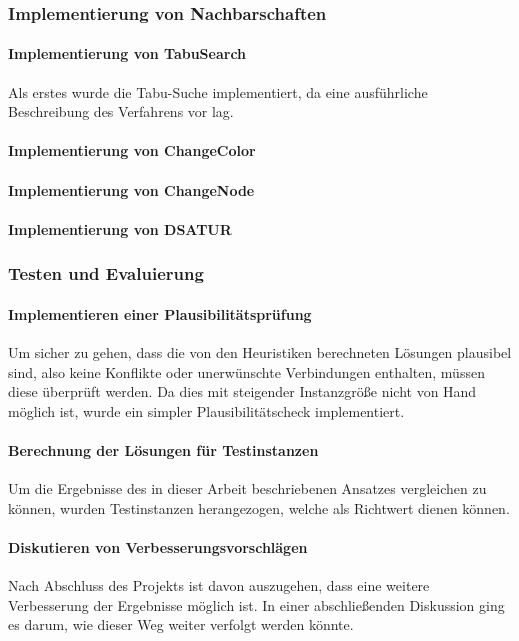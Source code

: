 \subsubsection{Implementierung von Nachbarschaften}

\paragraph{Implementierung von TabuSearch}{Als erstes wurde die Tabu-Suche implementiert, da eine ausführliche Beschreibung des Verfahrens vor lag.} %
\paragraph{Implementierung von ChangeColor}{} %
\paragraph{Implementierung von ChangeNode}{} %
\paragraph{Implementierung von DSATUR}{}

\subsubsection{Testen und Evaluierung}

\paragraph{Implementieren einer Plausibilitätsprüfung}{Um sicher zu gehen, dass die von den Heuristiken berechneten Lösungen plausibel sind, also keine Konflikte oder unerwünschte Verbindungen enthalten, müssen diese überprüft werden. Da dies mit steigender Instanzgröße nicht von Hand möglich ist, wurde ein simpler Plausibilitätscheck implementiert.}
\paragraph{Berechnung der Lösungen für Testinstanzen}{Um die Ergebnisse des in dieser Arbeit beschriebenen Ansatzes vergleichen zu können, wurden Testinstanzen herangezogen, welche als Richtwert dienen können.}
\paragraph{Diskutieren von Verbesserungsvorschlägen}{Nach Abschluss des Projekts ist davon auszugehen, dass eine weitere Verbesserung der Ergebnisse möglich ist. In einer abschließenden Diskussion ging es darum, wie dieser Weg weiter verfolgt werden könnte.}

